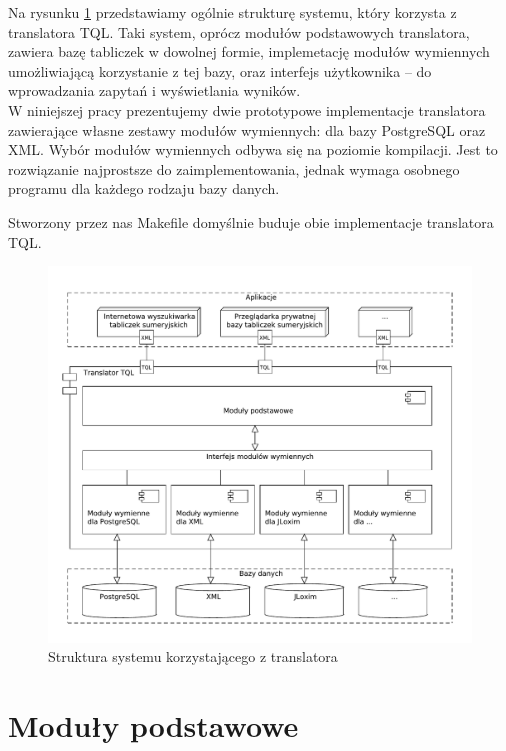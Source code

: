 Na rysunku \ref{struktura_systemu} przedstawiamy ogólnie strukturę systemu, który korzysta z translatora TQL. Taki system, oprócz modułów podstawowych translatora, zawiera bazę tabliczek w dowolnej formie, implemetację modułów wymiennych umożliwiającą korzystanie z tej bazy, oraz interfejs użytkownika -- do wprowadzania zapytań i wyświetlania wyników. \\

 W niniejszej pracy prezentujemy dwie prototypowe implementacje translatora zawierające własne zestawy modułów wymiennych: 
dla bazy PostgreSQL oraz XML.
Wybór modułów wymiennych odbywa się na poziomie kompilacji. Jest to rozwiązanie najprostsze do zaimplementowania,
jednak wymaga osobnego programu dla każdego rodzaju bazy danych.

 Stworzony przez nas Makefile domyślnie buduje obie implementacje translatora TQL.

\begin{figure}[h]
 \centering
 \includegraphics[width=450px,bb=0 0 608 517]{../diagramy/struktura2.pdf}
 \caption{Struktura systemu korzystającego z translatora}
 \label{struktura_systemu}
\end{figure}

\section{Moduły podstawowe}

